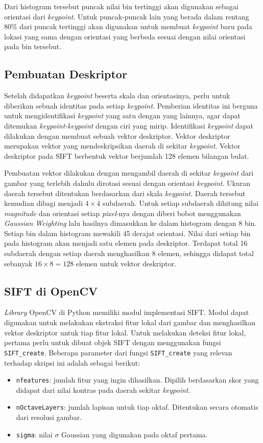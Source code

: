 Dari histogram tersebut puncak nilai bin tertinggi akan digunakan sebagai orientasi dari \textit{keypoint}. Untuk puncak-puncak lain yang berada dalam rentang $80\%$ dari puncak tertinggi akan digunakan untuk membuat \textit{keypoint} baru pada lokasi yang sama dengan orientasi yang berbeda sesuai dengan nilai orientasi pada bin tersebut.

\subsection{Pembuatan Deskriptor}
Setelah didapatkan \textit{keypoint} beserta skala dan orientasinya, perlu untuk diberikan sebuah identitas pada setiap \textit{keypoint}. Pemberian identitas ini berguna untuk mengidentifikasi \textit{keypoint} yang satu dengan yang lainnya, agar dapat ditemukan \textit{keypoint-keypoint} dengan ciri yang mirip. Identifikasi \textit{keypoint} dapat dilakukan dengan membuat sebuah vektor deskriptor. Vektor deskriptor merupakan vektor yang mendeskripsikan daerah di sekitar \textit{keypoint}. Vektor deskriptor pada SIFT berbentuk vektor berjumlah 128 elemen bilangan bulat.

Pembuatan vektor dilakukan dengan mengambil daerah di sekitar \textit{keypoint} dari gambar yang terlebih dahulu dirotasi sesuai dengan orientasi \textit{keypoint}. Ukuran daerah tersebut ditentukan berdasarkan dari skala \textit{keypoint}. Daerah tersebut kemudian dibagi menjadi $4\times4$ subdaerah. Untuk setiap subdaerah dihitung nilai \textit{magnitude} dan orientasi setiap \textit{pixel}-nya dengan diberi bobot menggunakan \textit{Gaussian Weighting} lalu hasilnya dimasukkan ke dalam histogram dengan 8 bin. Setiap bin dalam histogram mewakili 45 derajat orientasi. Nilai dari setiap bin pada histogram akan menjadi satu elemen pada deskriptor. Terdapat total 16 subdaerah dengan setiap daerah menghasilkan 8 elemen, sehingga didapat total sebanyak $16\times8=128$ elemen untuk vektor deskriptor. 

\subsection{SIFT di OpenCV}
\textit{Library} OpenCV di Python memiliki modul implementasi SIFT. Modul dapat digunakan untuk melakukan ekstraksi fitur lokal dari gambar dan menghasilkan vektor deskriptor untuk tiap fitur lokal. Untuk melakukan deteksi fitur lokal, pertama perlu untuk dibuat objek SIFT dengan menggunakan fungsi \texttt{SIFT\_create}. Beberapa parameter dari fungsi \texttt{SIFT\_create} yang relevan terhadap skripsi ini adalah sebagai berikut:
\begin{itemize}
	\item \texttt{nfeatures}: jumlah fitur yang ingin dihasilkan. Dipilih berdasarkan skor yang didapat dari nilai kontras pada daerah sekitar \textit{keypoint}.
	\item \texttt{nOctaveLayers}: jumlah lapisan untuk tiap oktaf. Ditentukan secara otomatis dari resolusi gambar.
	\item \texttt{sigma}: nilai $\sigma$ Gaussian yang digunakan pada oktaf pertama.
\end{itemize}

